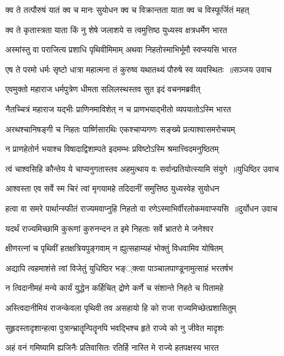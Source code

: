 \twolineshloka
{क्व ते तत्पौरुषं यातं क्व च मानः सुयोधन}
{क्व च विक्रान्तता याता क्व च विस्फूर्जितं महत्}


\twolineshloka
{क्व ते कृतास्त्रता याता किं नु शेषे जलाशये}
{स त्वमुत्तिष्ठ युध्यस्व क्षत्रधर्मेण भारत}


\twolineshloka
{अस्मांस्तु वा पराजित्य प्रशाधि पृथिवीमिमाम्}
{अथवा निहतोस्माभिर्भूमौ स्वप्स्यसि भारत}


\threelineshloka
{एष ते परमो धर्मः सृष्टो धात्रा महात्मना}
{तं कुरुष्व यथातथ्यं पौरुषे स्व व्यवस्थितः ॥सञ्जय उवाच}
{}


\twolineshloka
{एवमुक्तो महाराज धर्मपुत्रेण धीमता}
{सलिलस्थस्तव सुत इदं वचनमब्रवीत्}


\twolineshloka
{नैतच्चित्रं महाराज यद्भीः प्राणिनमाविशेत्}
{न च प्राणभयाद्भीतो व्यपयातोऽस्मि भारत}


\twolineshloka
{अरथश्चानिषङ्गी च निहतः पार्ष्णिसारथिः}
{एकश्चाप्यगणः सङ्ख्ये प्रत्याश्वासमरोचयम्}


\twolineshloka
{न प्राणहेतोर्न भयाश्च विषादाद्विशाम्पते}
{इदमम्भः प्रविष्टोऽस्मि श्रमात्त्विदमनुष्ठितम्}


\threelineshloka
{त्वं चाश्वसिहि कौन्तेय ये चाप्यनुगतास्तव}
{अहमुत्थाय वः सर्वान्प्रतियोत्स्यामि संयुगे ॥युधिष्ठिर उवाच}
{}


\twolineshloka
{आश्वस्ता एव सर्वे स्म चिरं त्वां मृगयामहे}
{तदिदानीं समुत्तिष्ठ युध्यस्वेह सुयोधन}


\threelineshloka
{हत्वा वा समरे पार्थान्स्फीतं राज्यमवाप्नुहि}
{निहतो वा रणेऽस्माभिर्वीरलोकमवाप्स्यसि ॥दुर्योधन उवाच}
{}


\twolineshloka
{यदर्थं राज्यमिच्छामि कुरूणां कुरुनन्दन}
{त इमे निहताः सर्वे भ्रातरो मे जनेश्वर}


\twolineshloka
{क्षीणरत्नां च पृथिवीं हतक्षत्रियपुङ्गवाम्}
{न ह्युत्सहाम्यहं भोक्तुं विधवामिव योषितम्}


\twolineshloka
{अद्यापि त्वहमाशंसे त्वां विजेतुं युधिष्ठिर}
{भङ््क्त्वा पाञ्चालपाण्डूनामुत्साहं भरतर्षभ}


\twolineshloka
{न त्विदानीमहं मन्ये कार्यं युद्धेन कर्हिचित्}
{द्रोणे कर्णे च संशान्ते निहते च पितामहे}


\twolineshloka
{अस्त्विदानीमियं राजन्केवला पृथिवी तव}
{असहायो हि को राजा राज्यमिच्छेत्प्रशासितुम्}


\twolineshloka
{सुहृदस्तादृशान्हत्वा पुत्रान्भ्रातॄन्पितॄनपि}
{भवद्भिश्च हृते राज्ये को नु जीवेत मादृशः}


\twolineshloka
{अहं वनं गमिष्यामि ह्यजिनैः प्रतिवासितः}
{रतिर्हि नास्ति मे राज्ये हतपक्षस्य भारत}



